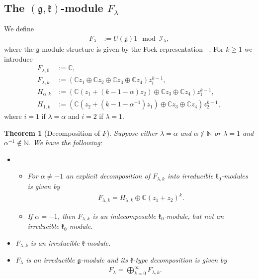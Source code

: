 \documentclass{amsart}
\newtheorem{theorem}{Theorem}
\numberwithin{theorem}{section}
\theoremstyle{definition}
\theoremstyle{remark}
\def\N{\mathds{N} }
\def\C{\mathds{C} }
\newcommand{\mf}[1]{\mathfrak{#1}}
\newcommand{\mc}[1]{\mathcal{#1}}
\DeclareMathOperator{\rol}{\rho_\lambda}
\newcommand{\Ila}{\mc I_\lambda}
\begin{document}
\subsection{The $(\mf g, \mf k)$-module $F_\lambda$}

We define
\begin{align*}
F_\lambda &:= U(\mathfrak{g})1 \mod \Ila,
\end{align*}
where the $\mf g$-module structure is given by the Fock representation $\rol$. For $k\geq 1$ we introduce
\begin{align*}
F_{\lambda,0} &:= \C,\\
F_{\lambda,k} &:= (\C {z_1} \oplus \C {z_2} \oplus \C {z_3} \oplus \C {z_4})z_i^{k-1},\\
H_{\alpha, k} &:= (\C ({z_1} + (k-1-\alpha){z_2} )\oplus \C {z_3} \oplus \C {z_4})z_1^{k-1},\\
H_{1, k} &:= (\C ({z_2} +(k-1-\alpha^{-1}){z_1} )\oplus \C {z_3} \oplus \C {z_4})z_2^{k-1},
\end{align*}
where $i=1$ if $\lambda=\alpha$ and $i=2$ if $\lambda=1$.

\begin{theorem}[Decomposition of $F$]\label{ThDecF}
Suppose either $\lambda=\alpha$ and $\alpha\not\in \N$ or $\lambda=1$ and $\alpha^{-1}\not\in \N$. We have the following:
\begin{itemize}
\item[(1)] \begin{itemize}
\item[(a)] For $\alpha \neq -1$ an explicit decomposition of $F_{\lambda,k}$ into irreducible $\mathfrak{k}_{0}$-modules is given by
\begin{align*}
F_{\lambda,k} = H_{\lambda,k} \oplus \C ({z_1} + {z_2})^k.
\end{align*}
\item[(b)] If $\alpha = -1$, then $F_{\lambda,k}$ is an indecomposable $\mathfrak{k}_{0}$-module, but not an irreducible $\mathfrak{k}_{0}$-module.
\end{itemize}
\item[(2)] $F_{\lambda,k}$ is an irreducible $\mf k$-module.
\item[(3)] $F_\lambda$ is an irreducible $\mathfrak{g}$-module and its $\mf k$-type decomposition is given by
\begin{align*}
F_{\lambda} = \bigoplus_{k=0}^\infty F_{\lambda,k}.
\end{align*}
\end{itemize}
\end{theorem}
\end{document}
